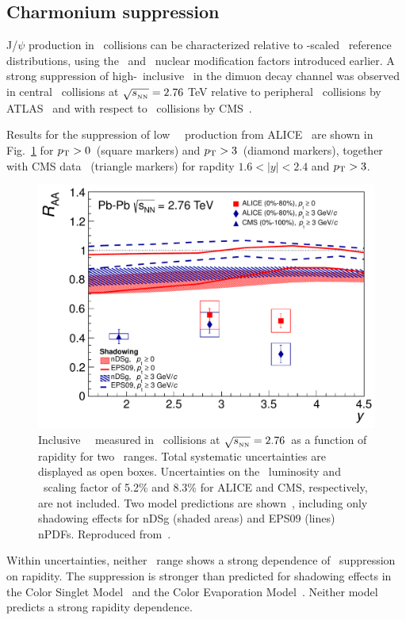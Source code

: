 \subsection{Charmonium suppression}

J/$\psi$ production in \PbPb\ collisions can be characterized relative to \Ncoll-scaled \pp\ reference
distributions, using the \Rcp\ and \Raa\ nuclear modification factors introduced earlier.
A strong suppression of high-\pT\ inclusive \jpsi\ in the dimuon decay channel 
was observed in central \PbPb\ collisions
at $\sqrt{s_{_{\rm NN}}} = 2.76$ TeV  relative to peripheral \PbPb\ collisions by ATLAS~\cite{Aad:2010aa}
and with respect to \pp\ collisions by CMS~\cite{Chatrchyan:2012np}.

Results for the suppression of low \pT\ \jpsi\ production from ALICE~\cite{Abelev:2012rv} are shown
in Fig.~\ref{fig:GR:raavsy} for $\mbox{$p_{\mathrm{T}}$} > 0$\GeVc\ (square markers) and
$\mbox{$p_{\mathrm{T}}$} > 3$\GeVc\ (diamond markers), together with CMS data~\cite{Chatrchyan:2012np} (triangle markers)
for rapdity $ 1.6 < |y| < 2.4 $ and $\mbox{$p_{\mathrm{T}}$} > 3$\GeVc.

\begin{figure}
\begin{center}
\includegraphics[width=0.49\linewidth]{qqbarfigures/RAAvsY_v7-eps-converted-to.pdf}
\caption{ \label{fig:GR:raavsy}  Inclusive \jpsi\ \Raa\ measured in \PbPb\
collisions at $\sqrt{s_{_{\rm NN}}} = 2.76$\TeV\ as a function of  rapidity for two \pT\ ranges.
Total systematic uncertainties are displayed as open boxes. 
Uncertainties on the \pp\ luminosity and \Taa\ scaling factor of
5.2\% and  8.3\% for ALICE and CMS, respectively, are not included.
Two model predictions are shown~\cite{Ferreiro:2011rw,Vogt:2010aa}, including only shadowing effects
for  nDSg (shaded areas) and EPS09 (lines) nPDFs. Reproduced from~\cite{Abelev:2012rv}.}
\end{center}
\end{figure}

Within uncertainties, neither \pT\ range shows a strong dependence of \jpsi\ suppression on rapidity.
The suppression is stronger than predicted for shadowing effects in the Color Singlet
Model~\cite{Ferreiro:2011rw} and the Color Evaporation Model~\cite{Vogt:2010aa}. Neither model
predicts a strong rapidity dependence.

